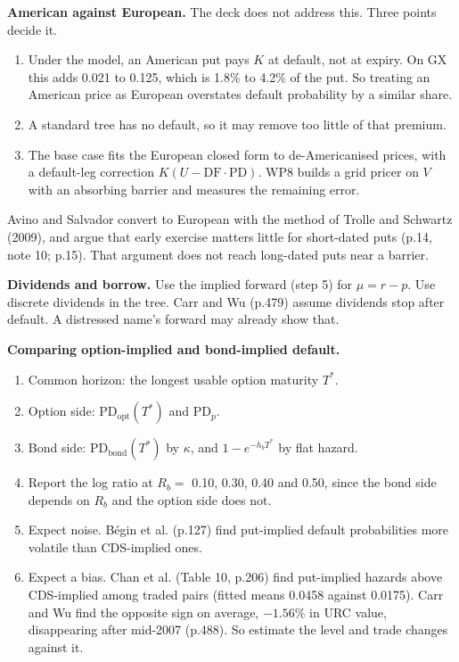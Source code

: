 \documentclass[10pt,a4paper]{article}
\newcommand{\PDopt}{\mathrm{PD}_{\mathrm{opt}}}
\newcommand{\PDbond}{\mathrm{PD}_{\mathrm{bond}}}
\newcommand{\DF}{\mathrm{DF}}
\begin{document}
\textbf{American against European.} The deck does not address this. Three points decide it.
\begin{enumerate}[nosep]
\item Under the model, an American put pays $K$ at default, not at expiry. On GX this adds 0.021 to 0.125, which is 1.8\% to 4.2\% of the put. So treating an American price as European overstates default probability by a similar share.
\item A standard tree has no default, so it may remove too little of that premium.
\item The base case fits the European closed form to de-Americanised prices, with a default-leg correction $K(U-\DF\cdot\mathrm{PD})$. WP8 builds a grid pricer on $V$ with an absorbing barrier and measures the remaining error.
\end{enumerate}
Avino and Salvador convert to European with the method of Trolle and Schwartz (2009), and argue that early exercise matters little for short-dated puts (p.14, note 10; p.15). That argument does not reach long-dated puts near a barrier.

\textbf{Dividends and borrow.} Use the implied forward (step 5) for $\mu=r-p$. Use discrete dividends in the tree. Carr and Wu (p.479) assume dividends stop after default. A distressed name's forward may already show that.

\textbf{Comparing option-implied and bond-implied default.}
\begin{enumerate}[nosep]
\item Common horizon: the longest usable option maturity $T^*$.
\item Option side: $\PDopt(T^*)$ and $\mathrm{PD}_p$.
\item Bond side: $\PDbond(T^*)$ by $\kappa$, and $1-e^{-h_bT^*}$ by flat hazard.
\item Report the log ratio at $R_b=$ 0.10, 0.30, 0.40 and 0.50, since the bond side depends on $R_b$ and the option side does not.
\item Expect noise. B\'egin et al. (p.127) find put-implied default probabilities more volatile than CDS-implied ones.
\item Expect a bias. Chan et al. (Table 10, p.206) find put-implied hazards above CDS-implied among traded pairs (fitted means 0.0458 against 0.0175). Carr and Wu find the opposite sign on average, $-1.56\%$ in URC value, disappearing after mid-2007 (p.488). So estimate the level and trade changes against it.
\end{enumerate}
\end{document}
